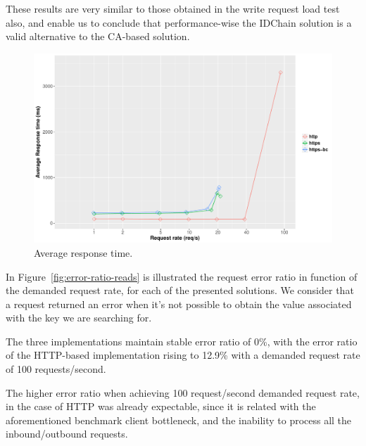These results are very similar to those obtained in the write request load test also, and enable us to conclude that performance-wise the IDChain solution is a valid alternative to the CA-based solution.


\begin{figure}[htb]
  \centering
  \includegraphics[scale=0.4]{Figures/evaluation/average-response-time-reads-new.pdf}
  \caption{Average response time.}
  \label{fig:average-response-time-reads}
\end{figure}

In Figure~\ref{fig:error-ratio-reads} is illustrated the request error ratio in function of the demanded request rate, for each of the presented solutions.
We consider that a request returned an error when it's not possible to obtain the value associated with the key we are searching for.

The three implementations maintain stable error ratio of 0\%, with the error ratio of the HTTP-based implementation rising to 12.9\% with a demanded request rate of 100 requests/second.

The higher error ratio when achieving 100 request/second demanded request rate, in the case of HTTP was already expectable, since it is related with the aforementioned benchmark client bottleneck, and the inability to process all the inbound/outbound requests.

